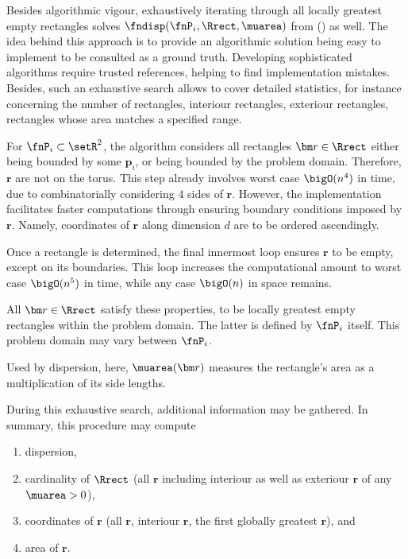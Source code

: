 %
Besides algorithmic vigour, exhaustively iterating through all locally greatest empty rectangles solves $\fndisp(\fnP_i, \Rrect, \muarea)$ from () as well. The idea behind this approach is to provide an algorithmic solution being easy to implement to be consulted as a ground truth. Developing sophisticated algorithms require trusted references, helping to find implementation mistakes. Besides, such an exhaustive search allows to cover detailed statistics, for instance concerning the number of rectangles, interiour rectangles, exteriour rectangles, rectangles whose area matches a specified range.

For $\fnP_i \subset \setR^2$, the algorithm considers all rectangles $\bm r \in \Rrect$ either being bounded by some $\bm p_i$, or being bounded by the problem domain. Therefore, $\bm r$ are not on the torus. This step already involves worst case $\bigO(n^4)$ in time, due to combinatorially considering $4$ sides of $\bm r$. However, the implementation facilitates faster computations through ensuring boundary conditions imposed by $\bm r$. Namely, coordinates of $\bm r$ along dimension $d$ are to be ordered ascendingly.

Once a rectangle is determined, the final innermost loop ensures $\bm r$ to be empty, except on its boundaries. This loop increases the computational amount to worst case $\bigO(n^5)$ in time, while any case $\bigO(n)$ in space remains.

All $\bm r \in \Rrect$ satisfy these properties, to be locally greatest empty rectangles within the problem domain. The latter is defined by $\fnP_i$ itself. This problem domain may vary between $\fnP_i$.

Used by dispersion, here, $\muarea(\bm r)$ measures the rectangle's area as a multiplication of its side lengths.

During this exhaustive search, additional information may be gathered. In summary, this procedure may compute
\begin{enumerate}
  \item dispersion,
  \item cardinality of $\Rrect$ (all $\bm r$ including interiour as well as exteriour $\bm r$ of any $\muarea > 0$),
  \item coordinates of $\bm r$ (all $\bm r$, interiour $\bm r$, the first globally greatest $\bm r$), and
  \item area of $\bm r$.
\end{enumerate}

